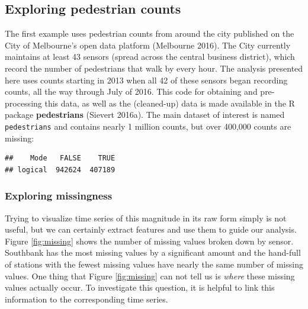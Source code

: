\documentclass[12pt,]{article}
\newenvironment{Shaded}{\begin{snugshade}}{\end{snugshade}}
\newcommand{\KeywordTok}[1]{\textcolor[rgb]{0.13,0.29,0.53}{\textbf{#1}}}
\newcommand{\DataTypeTok}[1]{\textcolor[rgb]{0.13,0.29,0.53}{#1}}
\newcommand{\StringTok}[1]{\textcolor[rgb]{0.31,0.60,0.02}{#1}}
\newcommand{\OperatorTok}[1]{\textcolor[rgb]{0.81,0.36,0.00}{\textbf{#1}}}
\newcommand{\NormalTok}[1]{#1}
\theoremstyle{definition}
\theoremstyle{definition}
\theoremstyle{remark}
\begin{document}
\hypertarget{exploring-pedestrian-counts}{\subsection{Exploring
pedestrian counts}\label{exploring-pedestrian-counts}}

The first example uses pedestrian counts from around the city published
on the City of Melbourne's open data platform (Melbourne 2016). The City
currently maintains at least 43 sensors (spread across the central
business district), which record the number of pedestrians that walk by
every hour. The analysis presented here uses counts starting in 2013
when all 42 of these sensors began recording counts, all the way through
July of 2016. This code for obtaining and pre-processing this data, as
well as the (cleaned-up) data is made available in the R package
\textbf{pedestrians} (Sievert 2016a). The main dataset of interest is
named \texttt{pedestrians} and contains nearly 1 million counts, but
over 400,000 counts are missing:

\begin{Shaded}
\end{Shaded}

\begin{verbatim}
##    Mode   FALSE    TRUE 
## logical  942624  407189
\end{verbatim}

\subsubsection{Exploring missingness}\label{exploring-missingness}

Trying to visualize time series of this magnitude in its raw form simply
is not useful, but we can certainly extract features and use them to
guide our analysis. Figure \ref{fig:missing} shows the number of missing
values broken down by sensor. Southbank has the most missing values by a
significant amount and the hand-full of stations with the fewest missing
values have nearly the same number of missing values. One thing that
Figure \ref{fig:missing} can not tell us is \emph{where} these missing
values actually occur. To investigate this question, it is helpful to
link this information to the corresponding time series.
\end{document}
